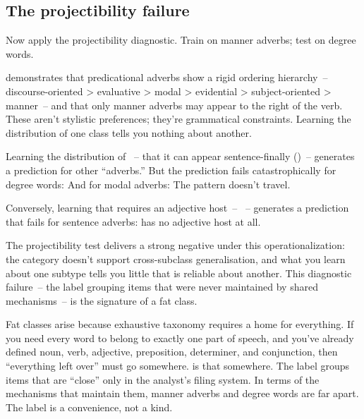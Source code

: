\subsection{The projectibility failure}
\label{sec:8:projectibility-failure}

Now apply the projectibility diagnostic. Train on manner adverbs; test on degree words.

\citet[45]{ernst2002syntax} demonstrates that predicational adverbs show a rigid ordering hierarchy~-- discourse-oriented > evaluative > modal > evidential > subject-oriented > manner~-- and that only manner adverbs may appear to the right of the verb. These aren't stylistic preferences; they're grammatical constraints. Learning the distribution of one class tells you nothing about another.

Learning the distribution of ~-- that it can appear sentence-finally ()~-- generates a prediction for other \enquote{adverbs.} But the prediction fails catastrophically for degree words: \ungram{} And for modal adverbs: \ungram{} The pattern doesn't travel.

Conversely, learning that  requires an adjective host~-- ~-- generates a prediction that fails for sentence adverbs:  has no adjective host at all.

The projectibility test delivers a strong negative under this operationalization: the category  doesn't support cross-subclass generalisation, and what you learn about one subtype tells you little that is reliable about another. This diagnostic failure~-- the label grouping items that were never maintained by shared mechanisms~-- is the signature of a fat class.

Fat classes arise because exhaustive taxonomy requires a home for everything. If you need every word to belong to exactly one part of speech, and you've already defined noun, verb, adjective, preposition, determiner, and conjunction, then \enquote{everything left over} must go somewhere.  is that somewhere. The label groups items that are \enquote{close} only in the analyst's filing system. In terms of the mechanisms that maintain them, manner adverbs and degree words are far apart. The label is a convenience, not a kind.

